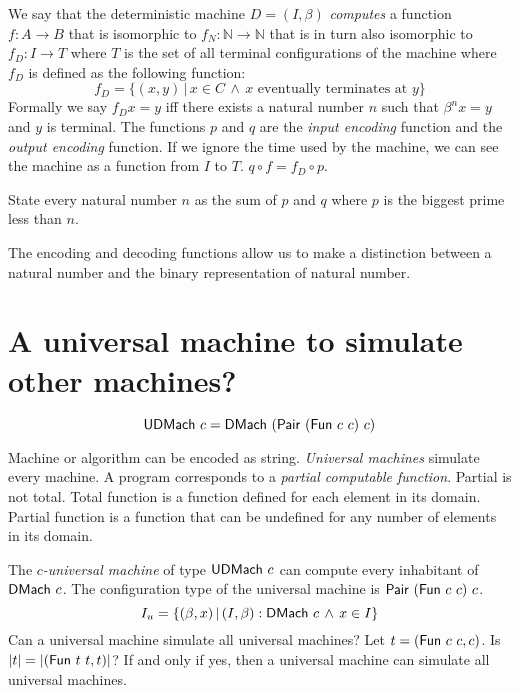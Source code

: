 We say that the deterministic machine $D = (I,\beta)$ \emph{computes} a function
$f : A \to B$
that is isomorphic to
$f_N : \mathbb{N} \to \mathbb{N}$
that is in turn also isomorphic to
$f_D : I \to T$
where $T$ is the set of all terminal configurations of the machine
where $f_D$ is defined as the following function:
\begin{equation}
    f_D = \{ (x,y) \,|\, x \in C \,\wedge\, x \text{ eventually terminates at } y \}
\end{equation}
Formally we say $f_D x = y$ iff there exists
a natural number $n$ such that $\beta^n x = y$ and $y$ is terminal.
The functions $p$ and $q$ are the \emph{input encoding} function
and the \emph{output encoding} function.
If we ignore the time used by the machine,
we can see the machine as a function from $I$ to $T$.
$q \circ f = f_D \circ p$.

State every natural number $n$ as the sum of $p$ and $q$
where $p$ is the biggest prime less than $n$.

The encoding and decoding functions allow us to make
a distinction between a natural number
and the binary representation of natural number.

\section{A universal machine to simulate other machines?}

\[
    \mathsf{UDMach}~c = \mathsf{DMach}~(\mathsf{Pair}~(\mathsf{Fun}~c~c)~c)
\]

Machine or algorithm can be encoded as string.
\emph{Universal machines} simulate every machine.
A program corresponds to a \emph{partial computable function}.
Partial is not total.
Total function is a function defined for each element in its domain.
Partial function is a function that can be undefined for any number of elements in its domain.

The \emph{$c$-universal machine} of type $\mathsf{UDMach}~c$ can compute every inhabitant of $\mathsf{DMach}~c$.
The configuration type of the universal machine is $\mathsf{Pair}~(\mathsf{Fun}~c~c)~c$.
\[
    I_u = \{ (\beta,x) \,|\, (I,\beta) : \mathsf{DMach}~c \,\wedge\, x \in I \}
\]
Can a universal machine simulate all universal machines?
Let $t = (\mathsf{Fun}~c~c,c)$.
Is $|t| = |(\mathsf{Fun}~t~t,t)|$?
If and only if yes, then a universal machine can simulate all universal machines.

